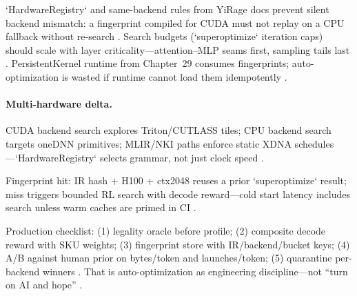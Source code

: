 `HardwareRegistry` and same-backend rules from YiRage docs prevent silent backend mismatch: a fingerprint compiled for CUDA must not replay on a CPU fallback without re-search \citep{yirage2026,chen2020compilerbasedhardw,amd2024xdna,amd2024aie,kwon2023vllm,patel2025llminference,taxbreak2026,memoryfloor2026,liu2024deepseekv3,dlbook,semianalysis2024tma,dao2022flashattention,dao2023flashdecoding,nvidia2024cudagraphs,nvidia2022hopper}. Search budgets (`superoptimize` iteration caps) should scale with layer criticality---attention--MLP seams first, sampling tails last \citep{yirage2026,dao2022flashattention,taxbreak2026,memoryfloor2026,patel2025llminference,kwon2023vllm,chen2020compilerbasedhardw,liu2024deepseekv3,amd2024aie,amd2024xdna,dlbook,semianalysis2024tma,dao2023flashdecoding,nvidia2024cudagraphs,nvidia2022hopper}. PersistentKernel runtime from Chapter~29 consumes fingerprints; auto-optimization is wasted if runtime cannot load them idempotently \citep{yirage2026,kwon2023vllm,patel2025llminference,chen2020compilerbasedhardw,memoryfloor2026,taxbreak2026,amd2024aie,dlbook,liu2024deepseekv3,amd2024xdna,semianalysis2024tma,dao2022flashattention,dao2023flashdecoding,nvidia2024cudagraphs,nvidia2022hopper}.

\paragraph{Multi-hardware delta.} CUDA backend search explores Triton/CUTLASS tiles; CPU backend search targets oneDNN primitives; MLIR/NKI paths enforce static XDNA schedules---`HardwareRegistry` selects grammar, not just clock speed \citep{yirage2026,amd2024xdna,amd2024aie,nvidia2022hopper,dlbook}.

\begin{example}
Fingerprint hit: IR hash + H100 + ctx2048 reuses a prior `superoptimize` result; miss triggers bounded RL search with decode reward---cold start latency includes search unless warm caches are primed in CI \citep{yirage2026,memoryfloor2026,kwon2023vllm}.
\end{example}

Production checklist: (1) legality oracle before profile; (2) composite decode reward with SKU weights; (3) fingerprint store with IR/backend/bucket keys; (4) A/B against human prior on bytes/token and launches/token; (5) quarantine per-backend winners \citep{yirage2026,chen2020compilerbasedhardw,patel2025llminference,taxbreak2026,memoryfloor2026,amd2024aie}. That is auto-optimization as engineering discipline---not ``turn on AI and hope'' \citep{dlbook,semianalysis2024tma,liu2024deepseekv3}.

